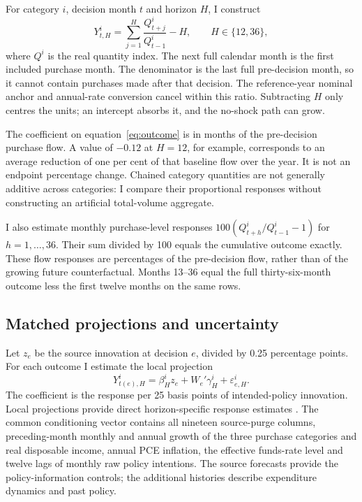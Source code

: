 \documentclass[11pt,a4paper]{article}
\begin{document}
For category $i$, decision month $t$ and horizon $H$, I construct
\begin{equation}
 Y^i_{t,H}=\sum_{j=1}^{H}\frac{Q^i_{t+j}}{Q^i_{t-1}}-H,\qquad H\in\{12,36\},\label{eq:outcome}
\end{equation}
where $Q^i$ is the real quantity index. The next full calendar month is the first included purchase month. The denominator is the last full pre-decision month, so it cannot contain purchases made after that decision. The reference-year nominal anchor and annual-rate conversion cancel within this ratio. Subtracting $H$ only centres the units; an intercept absorbs it, and the no-shock path can grow.

The coefficient on equation~\eqref{eq:outcome} is in months of the pre-decision purchase flow. A value of $-0.12$ at $H=12$, for example, corresponds to an average reduction of one per cent of that baseline flow over the year. It is not an endpoint percentage change. Chained category quantities are not generally additive across categories: I compare their proportional responses without constructing an artificial total-volume aggregate.

I also estimate monthly purchase-level responses $100(Q^i_{t+h}/Q^i_{t-1}-1)$ for $h=1,\ldots,36$. Their sum divided by 100 equals the cumulative outcome exactly. These flow responses are percentages of the pre-decision flow, rather than of the growing future counterfactual. Months 13--36 equal the full thirty-six-month outcome less the first twelve months on the same rows.

\subsection{Matched projections and uncertainty}

Let $z_e$ be the source innovation at decision $e$, divided by 0.25 percentage points. For each outcome I estimate the local projection
\begin{equation}
 Y^i_{t(e),H}=\beta^i_Hz_e+W_e'\gamma^i_H+\varepsilon^i_{e,H}.\label{eq:lp}
\end{equation}
The coefficient is the response per 25 basis points of intended-policy innovation. Local projections provide direct horizon-specific response estimates \citep{Jorda2005}. The common conditioning vector contains all nineteen source-purge columns, preceding-month monthly and annual growth of the three purchase categories and real disposable income, annual PCE inflation, the effective funds-rate level and twelve lags of monthly raw policy intentions. The source forecasts provide the policy-information controls; the additional histories describe expenditure dynamics and past policy.
\end{document}
